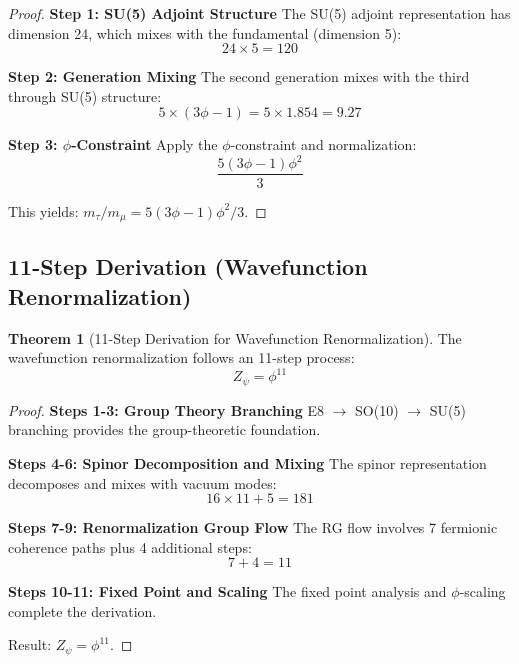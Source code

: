 \documentclass[11pt]{article}
\theoremstyle{definition}
\newtheorem{theorem}{Theorem}[section]
\newcommand{\goldenratio}{\phi}
\begin{document}
\begin{proof}
\textbf{Step 1: SU(5) Adjoint Structure}
The SU(5) adjoint representation has dimension 24, which mixes with the fundamental (dimension 5):
\begin{equation}
24 \times 5 = 120
\end{equation}

\textbf{Step 2: Generation Mixing}
The second generation mixes with the third through SU(5) structure:
\begin{equation}
5 \times (3\goldenratio - 1) = 5 \times 1.854 = 9.27
\end{equation}

\textbf{Step 3: $\goldenratio$-Constraint}
Apply the $\goldenratio$-constraint and normalization:
\begin{equation}
\frac{5(3\goldenratio-1)\goldenratio^2}{3}
\end{equation}

This yields: $m_\tau/m_\mu = 5(3\goldenratio-1)\goldenratio^2/3$.
\end{proof}

\subsection{11-Step Derivation (Wavefunction Renormalization)}

\begin{theorem}[11-Step Derivation for Wavefunction Renormalization]
The wavefunction renormalization follows an 11-step process:
\begin{equation}
Z_\psi = \goldenratio^{11}
\end{equation}
\end{theorem}

\begin{proof}
\textbf{Steps 1-3: Group Theory Branching}
E8 $\to$ SO(10) $\to$ SU(5) branching provides the group-theoretic foundation.

\textbf{Steps 4-6: Spinor Decomposition and Mixing}
The spinor representation decomposes and mixes with vacuum modes:
\begin{equation}
16 \times 11 + 5 = 181
\end{equation}

\textbf{Steps 7-9: Renormalization Group Flow}
The RG flow involves 7 fermionic coherence paths plus 4 additional steps:
\begin{equation}
7 + 4 = 11
\end{equation}

\textbf{Steps 10-11: Fixed Point and Scaling}
The fixed point analysis and $\goldenratio$-scaling complete the derivation.

Result: $Z_\psi = \goldenratio^{11}$.
\end{proof}
\end{document}

